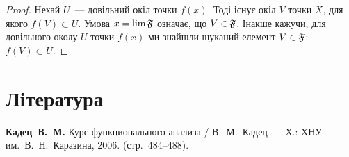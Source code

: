 \begin{proof}
    Нехай $U$~--- довільний окіл точки $f(x)$. Тоді існує окіл $V$ точки $X$, для якого $f(V) \subset U$. Умова $x = \lim \frak F$ означає, що $V \in \frak F$. Інакше кажучи, для довільного околу $U$ точки $f(x)$ ми знайшли шуканий елемент $V \in \frak F$: $f(V) \subset U$.
\end{proof}

\section{Література}

\begin{enumerate}[label={[\arabic*]}]
\item \textbf{Кадец~В.~М.}
Курс функционального анализа /
В.~М.~Кадец~---
Х.: ХНУ им.~В.~Н.~Каразина, 2006. (стр.~484--488).
\end{enumerate}
